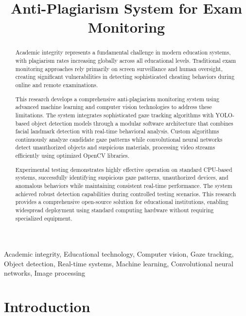 \documentclass[conference]{IEEEtran}
\title{Anti-Plagiarism System for Exam Monitoring}
\author{
    \IEEEauthorblockN{Valentin Pletea-Marinescu}
    \IEEEauthorblockA{
        \textit{National University of Science and Technology POLITEHNICA Bucharest}\\
        Email: \texttt{pletea.valentin2003@gmail.com}
    }
}
\begin{document}
\maketitle

\begin{abstract}
Academic integrity represents a fundamental challenge in modern education systems, with plagiarism rates increasing globally across all educational levels. Traditional exam monitoring approaches rely primarily on screen surveillance and human oversight, creating significant vulnerabilities in detecting sophisticated cheating behaviors during online and remote examinations.

This research develops a comprehensive anti-plagiarism monitoring system using advanced machine learning and computer vision technologies to address these limitations. The system integrates sophisticated gaze tracking algorithms with YOLO-based object detection models through a modular software architecture that combines facial landmark detection with real-time behavioral analysis. Custom algorithms continuously analyze candidate gaze patterns while convolutional neural networks detect unauthorized objects and suspicious materials, processing video streams efficiently using optimized OpenCV libraries.

Experimental testing demonstrates highly effective operation on standard CPU-based systems, successfully identifying suspicious gaze patterns, unauthorized devices, and anomalous behaviors while maintaining consistent real-time performance. The system achieved robust detection capabilities during controlled testing scenarios. This research provides a comprehensive open-source solution for educational institutions, enabling widespread deployment using standard computing hardware without requiring specialized equipment.
\end{abstract}

\begin{IEEEkeywords}
Academic integrity, Educational technology, Computer vision, Gaze tracking, Object detection, Real-time systems, Machine learning, Convolutional neural networks, Image processing
\end{IEEEkeywords}

\section{Introduction}
\end{document}
